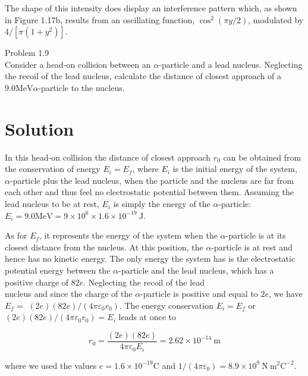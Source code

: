 \documentclass[10pt]{article}
\begin{document}
The shape of this intensity does display an interference pattern which, as shown in Figure 1.17b, results from an oscillating function, $\cos ^{2}(\pi y / 2)$, modulated by $4 /\left[\pi\left(1+y^{2}\right)\right]$.

Problem 1.9\\
Consider a head-on collision between an $\alpha$-particle and a lead nucleus. Neglecting the recoil of the lead nucleus, calculate the distance of closest approach of a $9.0 \mathrm{MeV} \alpha$-particle to the nucleus.

\section*{Solution}
In this head-on collision the distance of closest approach $r_{0}$ can be obtained from the conservation of energy $E_{i}=E_{f}$, where $E_{i}$ is the initial energy of the system, $\alpha$-particle plus the lead nucleus, when the particle and the nucleus are far from each other and thus feel no electrostatic potential between them. Assuming the lead nucleus to be at rest, $E_{i}$ is simply the energy of the $\alpha$-particle: $E_{i}=9.0 \mathrm{MeV}=9 \times 10^{6} \times 1.6 \times 10^{-19} \mathrm{~J}$.

As for $E_{f}$, it represents the energy of the system when the $\alpha$-particle is at its closest distance from the nucleus. At this position, the $\alpha$-particle is at rest and hence has no kinetic energy. The only energy the system has is the electrostatic potential energy between the $\alpha$-particle and the lead nucleus, which has a positive charge of $82 e$. Neglecting the recoil of the lead\\
nucleus and since the charge of the $\alpha$-particle is positive and equal to $2 e$, we have $E_{f}=$ $(2 e)(82 e) /\left(4 \pi \varepsilon_{0} r_{0}\right)$. The energy conservation $E_{i}=E_{f}$ or $(2 e)(82 e) /\left(4 \pi \varepsilon_{0} r_{0}\right)=E_{i}$ leads at once to


\begin{equation*}
r_{0}=\frac{(2 e)(82 e)}{4 \pi \varepsilon_{0} E_{i}}=2.62 \times 10^{-14} \mathrm{~m} \tag{1.192}
\end{equation*}


where we used the values $e=1.6 \times 10^{-19} \mathrm{C}$ and $1 /\left(4 \pi \varepsilon_{0}\right)=8.9 \times 10^{9} \mathrm{~N} \mathrm{~m}^{2} \mathrm{C}^{-2}$.
\end{document}
